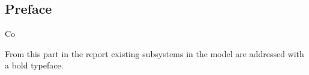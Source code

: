 \subsection{Preface}

Co

From this part in the report existing subsystems in the model are addressed with a bold typeface.
